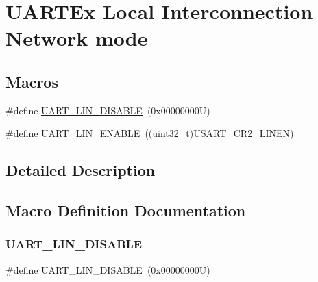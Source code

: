 \hypertarget{group___u_a_r_t_ex___l_i_n}{}\section{U\+A\+R\+T\+Ex Local Interconnection Network mode}
\label{group___u_a_r_t_ex___l_i_n}
\subsection*{Macros}
\begin{DoxyCompactItemize}
\item 
\#define \hyperlink{group___u_a_r_t_ex___l_i_n_ga7bc4a2de3d6b29235188020628c4b30c}{U\+A\+R\+T\+\_\+\+L\+I\+N\+\_\+\+D\+I\+S\+A\+B\+LE}~(0x00000000\+U)
\item 
\#define \hyperlink{group___u_a_r_t_ex___l_i_n_gaf3f2741d3af2737c51c3040e79fdc664}{U\+A\+R\+T\+\_\+\+L\+I\+N\+\_\+\+E\+N\+A\+B\+LE}~((uint32\+\_\+t)\hyperlink{group___peripheral___registers___bits___definition_gac8931efa62c29d92f5c0ec5a05f907ef}{U\+S\+A\+R\+T\+\_\+\+C\+R2\+\_\+\+L\+I\+N\+EN})
\end{DoxyCompactItemize}


\subsection{Detailed Description}


\subsection{Macro Definition Documentation}
\mbox{\label{group___u_a_r_t_ex___l_i_n_ga7bc4a2de3d6b29235188020628c4b30c}} 
\subsubsection{\texorpdfstring{U\+A\+R\+T\+\_\+\+L\+I\+N\+\_\+\+D\+I\+S\+A\+B\+LE}{UART\_LIN\_DISABLE}}
{\footnotesize\ttfamily \#define U\+A\+R\+T\+\_\+\+L\+I\+N\+\_\+\+D\+I\+S\+A\+B\+LE~(0x00000000\+U)}

